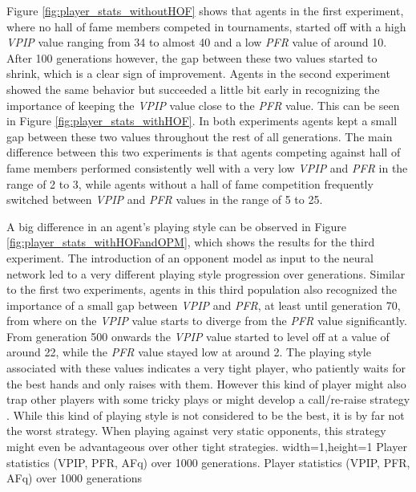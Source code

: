 Figure \ref{fig:player_stats_withoutHOF} shows that agents in the first experiment, where no hall of fame members competed in tournaments, started off with a high \textit{VPIP} value ranging from 34 to almost 40 and a low \textit{PFR} value of around 10. After 100 generations however, the gap between these two values started to shrink, which is a clear sign of improvement. Agents in the second experiment showed the same behavior but succeeded a little bit early in recognizing the importance of keeping the \textit{VPIP} value close to the \textit{PFR} value. This can be seen in Figure \ref{fig:player_stats_withHOF}. In both experiments agents kept a small gap between these two values throughout the rest of all generations. The main difference between this two experiments is that agents competing against hall of fame members performed consistently well with a very low \textit{VPIP} and \textit{PFR} in the range of 2 to 3, while agents without a hall of fame competition frequently switched between \textit{VPIP} and \textit{PFR} values in the range of 5 to 25. \par
A big difference in an agent's playing style can be observed in Figure \ref{fig:player_stats_withHOFandOPM}, which shows the results for the third experiment. The introduction of an opponent model as input to the neural network led to a very different playing style progression over generations. Similar to the first two experiments, agents in this third population also recognized the importance of a small gap between \textit{VPIP} and \textit{PFR}, at least until generation 70, from where on the \textit{VPIP} value starts to diverge from the \textit{PFR} value significantly. From generation 500 onwards the \textit{VPIP} value started to level off at a value of around 22, while the \textit{PFR} value stayed low at around 2. The playing style associated with these values indicates a very tight player, who patiently waits for the best hands and only raises with them. However this kind of player might also trap other players with some tricky plays or might develop a call/re-raise strategy \cite{playing_style}. While this kind of playing style is not considered to be the best, it is by far not the worst strategy. When playing against very static opponents, this strategy might even be advantageous over other tight strategies.
  {width=1\textwidth,height=1\textheight}%
  {Player statistics (VPIP, PFR, AFq) over 1000 generations.}%
  {Player statistics (VPIP, PFR, AFq) over 1000 generations}%
